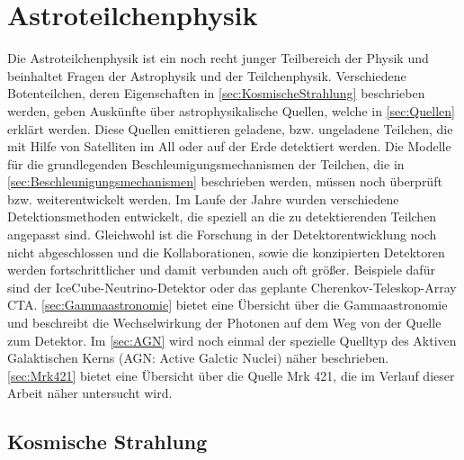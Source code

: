 \chapter{Astroteilchenphysik}
\label{chapter:Astroteilchenphysik}
Die Astroteilchenphysik ist ein noch recht junger Teilbereich der Physik und beinhaltet Fragen der Astrophysik und der Teilchenphysik.
Verschiedene Botenteilchen, deren Eigenschaften in \autoref{sec:KosmischeStrahlung} beschrieben werden, geben Auskünfte über astrophysikalische Quellen, welche in \autoref{sec:Quellen} erklärt werden.
Diese Quellen emittieren geladene, bzw.  ungeladene Teilchen, die mit Hilfe von Satelliten im All oder auf der Erde detektiert werden.
Die Modelle für die grundlegenden Beschleunigungsmechanismen der Teilchen, die in \autoref{sec:Beschleunigungsmechanismen} beschrieben werden, müssen noch überprüft bzw. weiterentwickelt werden.
Im Laufe der Jahre wurden verschiedene Detektionsmethoden entwickelt, die speziell an die zu detektierenden Teilchen angepasst sind.
Gleichwohl ist die Forschung in der Detektorentwicklung noch nicht abgeschlossen und die Kollaborationen, sowie die konzipierten Detektoren werden fortschrittlicher und damit verbunden auch oft größer.
Beispiele dafür sind der IceCube-Neutrino-Detektor oder das geplante Cherenkov-Teleskop-Array CTA.
\autoref{sec:Gammaastronomie} bietet eine Übersicht über die Gammaastronomie und beschreibt die Wechselwirkung der Photonen auf dem Weg von der Quelle zum Detektor. 
Im \autoref{sec:AGN} wird noch einmal der spezielle Quelltyp des Aktiven Galaktischen Kerns (AGN: Active Galctic Nuclei) näher beschrieben.
\autoref{sec:Mrk421} bietet eine Übersicht über die Quelle Mrk 421, die im Verlauf dieser Arbeit näher untersucht wird.

\section{Kosmische Strahlung}
\label{sec:KosmischeStrahlung}

